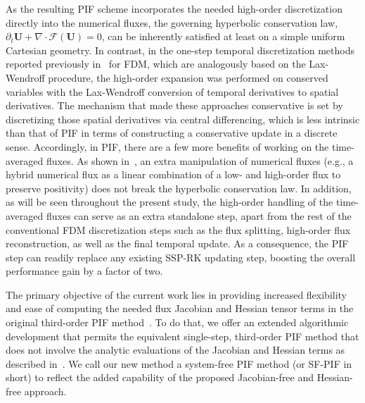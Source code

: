 \documentclass[times,preprint,3p]{elsarticle}
\newcommand{\bU}{\mathbf{U}}
\begin{document}
As the resulting PIF scheme incorporates the needed high-order discretization
directly into the numerical fluxes, the governing hyperbolic conservation law,
$\partial_t\bU +\nabla\cdot \mathcal{F}(\bU) = 0$,
can be inherently satisfied
at least on a simple uniform Cartesian geometry.
In contrast, %
in the one-step temporal discretization
methods reported previously in~\cite{qiu2003finite, jiang2013alternative} for FDM,
which are analogously based on the Lax-Wendroff procedure,
the high-order expansion was performed on conserved variables
with the Lax-Wendroff conversion of temporal derivatives to spatial derivatives.
The mechanism that made these approaches conservative
is set by discretizing those spatial derivatives via central differencing,
which is less intrinsic than that of PIF in terms of constructing
a conservative update in a discrete sense.
%
Accordingly, in PIF, there are a few more benefits of working on the time-averaged fluxes.
As shown in~\cite{seal2016explicit}, an extra manipulation of numerical fluxes
(e.g., a hybrid numerical flux as a linear combination of a low- and high-order flux
to preserve positivity) does not break the hyperbolic conservation law.
In addition, as will be seen throughout the present study,
the high-order handling of the time-averaged fluxes can serve
as an extra standalone step, apart from the rest of the conventional FDM discretization steps
such as the flux splitting, high-order flux reconstruction, as well as the final temporal update.
As a consequence, the PIF step can readily replace any existing SSP-RK updating step,
boosting the overall performance gain by a factor of two.

The primary objective of the current work lies in providing increased flexibility
and ease of computing the needed flux Jacobian and Hessian tensor terms
in the original third-order PIF method~\cite{christlieb2015picard, seal2016explicit}.
To do that, we offer an extended algorithmic development that permits
the equivalent single-step, third-order PIF method that does not involve
the analytic evaluations %
of the Jacobian and Hessian terms as described
in~\cite{christlieb2015picard, seal2016explicit}.
We call our new method  a system-free PIF method (or SF-PIF in short)
to reflect the added capability of the proposed Jacobian-free and Hessian-free approach.
\end{document}
